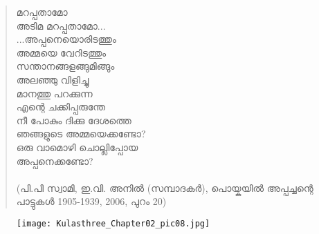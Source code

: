 \begin{tcolorbox}[%
  breakable, %
  arc=0mm, 
  left=1pt, right = 1pt, 
  boxrule=0mm,
  colback = {blue!10}, %
]
\begin{quote}{}
മറപ്പതാമോ\\
അടിമ മറപ്പതാമോ...\\
...അപ്പനെയൊരിടത്തും\\
അമ്മയെ വേറിടത്തും\\
സന്താനങ്ങളങ്ങുമിങ്ങും\\
അലഞ്ഞു വിളിച്ചു\\
മാനത്തു പറക്കുന്ന\\
എന്റെ ചക്കിപ്പരുന്തേ\\
നീ പോകും ദിക്കു ദേശത്തെ\\
ഞങ്ങളുടെ അമ്മയെക്കണ്ടോ?\\
ഒരു വാമൊഴി ചൊല്ലിപ്പോയ\\
അപ്പനെക്കണ്ടോ?\\
\\(പി.പി സ്വാമി, ഇ.വി. അനിൽ (സമ്പാദകർ), പൊയ്കയിൽ അപ്പച്ചന്റെ പാട്ടുകൾ 1905-1939, 2006, പുറം 20)
\end{quote}
\end{tcolorbox}

\begin{figure}[h]
\begin{center}
\texttt{[image: Kulasthree\_Chapter02\_pic08.jpg]}
\end{center}
\end{figure}

